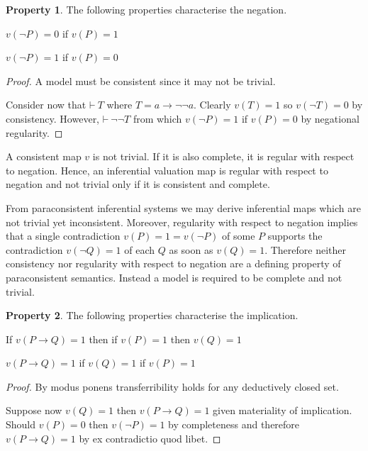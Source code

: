 \documentclass{amsbook}
\newcommand{\theorem}{\mathord\vdash\medspace}
\newcommand{\then}{\mathrel\rightarrow}
\theoremstyle{definition}
\newtheorem{prop}{Property}[section]
\begin{document}
\begin{prop}
    The following properties characterise the negation.
    \begin{description}[
            labelindent=\parindent,
            before={
                    \renewcommand\makelabel[1]{(##1).}
                }
        ]
        \item[consistency] $v(\neg P) = 0$ if $v(P) = 1$
        \item[completeness] $v(\neg P) = 1$ if $v(P) = 0$
    \end{description}

    \begin{proof}
        A model must be consistent since it may not be trivial.

        Consider now that $\theorem T$ where $T = a \then \neg\neg a$. Clearly $v(T) = 1$ so $v(\neg T) = 0$ by consistency. However, $\theorem \neg\neg T$ from which $v(\neg P) = 1$ if $v(P) = 0$ by negational regularity.
    \end{proof}
\end{prop}

A consistent map $v$ is not trivial. If it is also complete, it is regular with respect to negation. Hence, an inferential valuation map is regular with respect to negation and not trivial only if it is consistent and complete.

From paraconsistent inferential systems we may derive inferential maps which are not trivial yet inconsistent. Moreover, regularity with respect to negation implies that a single contradiction $v(P) = 1 = v(\neg P)$ of some $P$ supports the contradiction $v(\neg Q) = 1$ of each $Q$ as soon as $v(Q) = 1$. Therefore neither consistency nor regularity with respect to negation are a defining property of paraconsistent semantics. Instead a model is required to be complete and not trivial.

\begin{prop}
    The following properties characterise the implication.
    \begin{description}[
            labelindent=\parindent,
            before={
                    \renewcommand\makelabel[1]{(##1).}
                }
        ]
        \item[transferrable] If $v(P \then Q) = 1$ then if $v(P) = 1$ then $v(Q) = 1$
        \item[decidable] $v(P \then Q) = 1$ if $v(Q) = 1$ if $v(P) = 1$
    \end{description}
    \begin{proof}
        By modus ponens transferribility holds for any deductively closed set.

        Suppose now $v(Q) = 1$ then $v(P \then Q) = 1$ given materiality of implication. Should $v(P) = 0$ then $v(\neg P) = 1$ by completeness and therefore $v(P \then Q) = 1$ by ex contradictio quod libet.
    \end{proof}
\end{prop}
\end{document}
